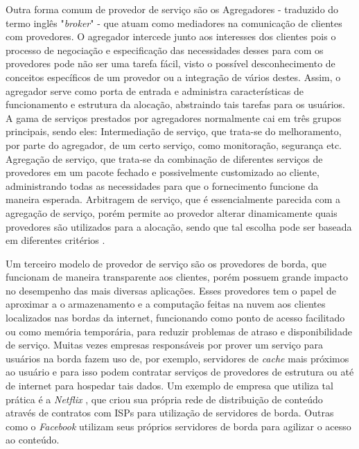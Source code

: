 Outra forma comum de provedor de serviço são os Agregadores - traduzido do termo inglês "\textit{broker}" - que atuam como mediadores na comunicação de clientes com provedores. O agregador intercede junto aos interesses dos clientes pois o processo de negociação e especificação das necessidades desses para com os provedores pode não ser uma tarefa fácil, visto o possível desconhecimento de conceitos específicos de um provedor ou a integração de vários destes. Assim, o agregador serve como porta de entrada e administra características de funcionamento e estrutura da alocação, abstraindo tais tarefas para os usuários. A gama de serviços prestados por agregadores normalmente cai em três grupos principais, sendo eles: Intermediação de serviço, que trata-se do melhoramento, por parte do agregador, de um certo serviço, como monitoração, segurança etc. Agregação de serviço, que trata-se da combinação de diferentes serviços de provedores em um pacote fechado e possivelmente customizado ao cliente, administrando todas as necessidades para que o fornecimento funcione da maneira esperada. Arbitragem de serviço, que é essencialmente parecida com a agregação de serviço, porém permite ao provedor alterar dinamicamente quais provedores são utilizados para a alocação, sendo que tal escolha pode ser baseada em diferentes critérios \cite{nuvem_sla:nist_broker}.

%
Um terceiro modelo de provedor de serviço são os provedores de borda, que funcionam de maneira transparente aos clientes, porém possuem grande impacto no desempenho das mais diversas aplicações. Esses provedores tem o papel de aproximar a o armazenamento e a computação feitas na nuvem aos clientes localizados nas bordas da internet, funcionando como ponto de acesso facilitado ou como memória temporária, para reduzir problemas de atraso e disponibilidade de serviço. Muitas vezes empresas responsáveis por prover um serviço para usuários na borda fazem uso de, por exemplo, servidores de \textit{cache} mais próximos ao usuário e para isso podem contratar serviços de provedores de estrutura ou até de internet para hospedar tais dados. Um exemplo de empresa que utiliza tal prática é a \textit{Netflix} \cite{nuvem_sla:netflix_borda}, que criou sua própria rede de distribuição de conteúdo através de contratos com \acp{ISP} para utilização de servidores de borda. Outras como o \textit{Facebook} \cite{nuvem_sla:facebook_borda} utilizam seus próprios servidores de borda para agilizar o acesso ao conteúdo.
%
%
